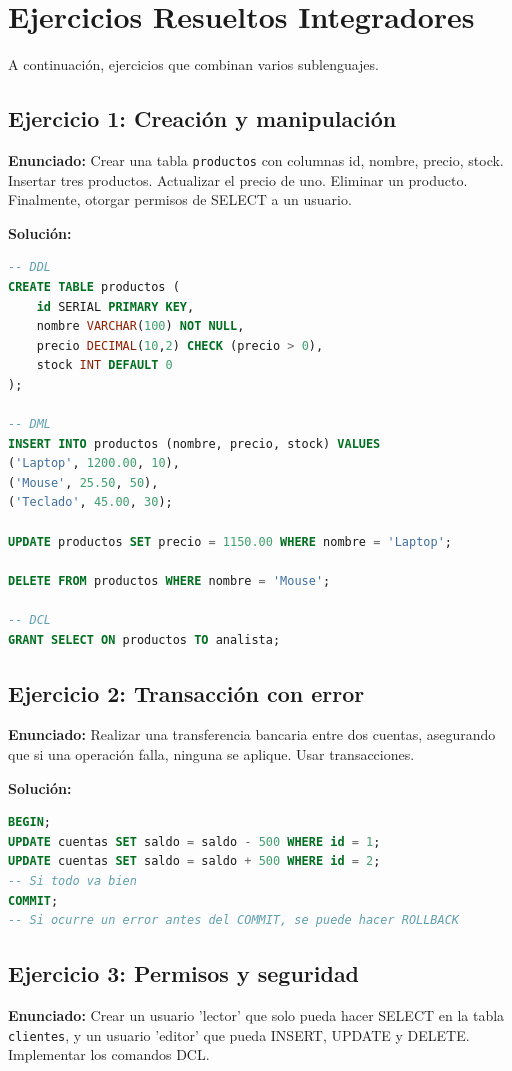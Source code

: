 \documentclass[12pt,a4paper,openany,oneside]{book}
\begin{document}
\section{Ejercicios Resueltos Integradores}
A continuación, ejercicios que combinan varios sublenguajes.

\subsection{Ejercicio 1: Creación y manipulación}
\textbf{Enunciado:} Crear una tabla \texttt{productos} con columnas id, nombre, precio, stock. Insertar tres productos. Actualizar el precio de uno. Eliminar un producto. Finalmente, otorgar permisos de SELECT a un usuario.

\textbf{Solución:}
\begin{lstlisting}[language=SQL]
-- DDL
CREATE TABLE productos (
    id SERIAL PRIMARY KEY,
    nombre VARCHAR(100) NOT NULL,
    precio DECIMAL(10,2) CHECK (precio > 0),
    stock INT DEFAULT 0
);

-- DML
INSERT INTO productos (nombre, precio, stock) VALUES
('Laptop', 1200.00, 10),
('Mouse', 25.50, 50),
('Teclado', 45.00, 30);

UPDATE productos SET precio = 1150.00 WHERE nombre = 'Laptop';

DELETE FROM productos WHERE nombre = 'Mouse';

-- DCL
GRANT SELECT ON productos TO analista;
\end{lstlisting}

\subsection{Ejercicio 2: Transacción con error}
\textbf{Enunciado:} Realizar una transferencia bancaria entre dos cuentas, asegurando que si una operación falla, ninguna se aplique. Usar transacciones.

\textbf{Solución:}
\begin{lstlisting}[language=SQL]
BEGIN;
UPDATE cuentas SET saldo = saldo - 500 WHERE id = 1;
UPDATE cuentas SET saldo = saldo + 500 WHERE id = 2;
-- Si todo va bien
COMMIT;
-- Si ocurre un error antes del COMMIT, se puede hacer ROLLBACK
\end{lstlisting}

\subsection{Ejercicio 3: Permisos y seguridad}
\textbf{Enunciado:} Crear un usuario 'lector' que solo pueda hacer SELECT en la tabla \texttt{clientes}, y un usuario 'editor' que pueda INSERT, UPDATE y DELETE. Implementar los comandos DCL.
\end{document}
